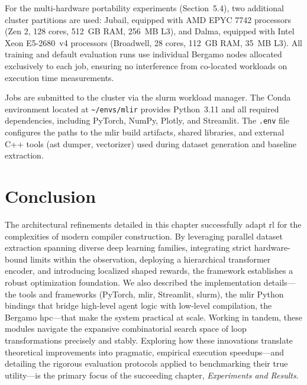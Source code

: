For the multi-hardware portability experiments (Section~5.4), two additional cluster partitions are used: Jubail, equipped with AMD EPYC 7742 processors (Zen 2, 128 cores, 512~GB RAM, 256~MB L3), and Dalma, equipped with Intel Xeon E5-2680~v4 processors (Broadwell, 28 cores, 112~GB RAM, 35~MB L3). All training and default evaluation runs use individual Bergamo nodes allocated exclusively to each job, ensuring no interference from co-located workloads on execution time measurements.

Jobs are submitted to the cluster via the \gls{slurm} workload manager. The Conda environment located at \texttt{\textasciitilde/envs/mlir} provides Python~3.11 and all required dependencies, including PyTorch, NumPy, Plotly, and Streamlit. The \texttt{.env} file configures the paths to the \gls{mlir} build artifacts, shared libraries, and external C++ tools (\gls{ast} dumper, vectorizer) used during dataset generation and baseline extraction.

\section{Conclusion}
The architectural refinements detailed in this chapter successfully adapt \gls{rl} for the complexities of modern compiler construction. By leveraging parallel dataset extraction spanning diverse deep learning families, integrating strict hardware-bound limits within the observation, deploying a hierarchical transformer encoder, and introducing localized shaped rewards, the framework establishes a robust optimization foundation. We also described the implementation details---the tools and frameworks (PyTorch, \gls{mlir}, Streamlit, \gls{slurm}), the \gls{mlir} Python bindings that bridge high-level agent logic with low-level compilation, the Bergamo \gls{hpc}---that make the system practical at scale. Working in tandem, these modules navigate the expansive combinatorial search space of loop transformations precisely and stably. Exploring how these innovations translate theoretical improvements into pragmatic, empirical execution speedups---and detailing the rigorous evaluation protocols applied to benchmarking their true utility---is the primary focus of the succeeding chapter, \textit{Experiments and Results}.
